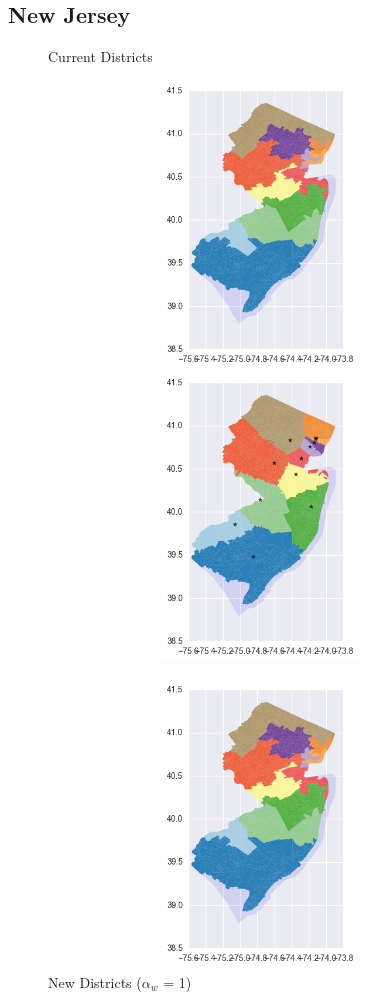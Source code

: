 \clearpage
\newpage

\subsection{New Jersey}
\begin{figure}[htb!] \centering
\caption{ Current Districts }
\includegraphics[width=5in,height=3in,keepaspectratio]{../maps/NJ/static/before.png}
\includegraphics[width=5in,height=3in,keepaspectratio]{../maps/NJ/static/0_0_after.png}
\caption{ New Districts ($\alpha_w$ = 1) }
\includegraphics[width=5in,height=3in,keepaspectratio]{../maps/NJ/static/before.png}

\end{figure}
